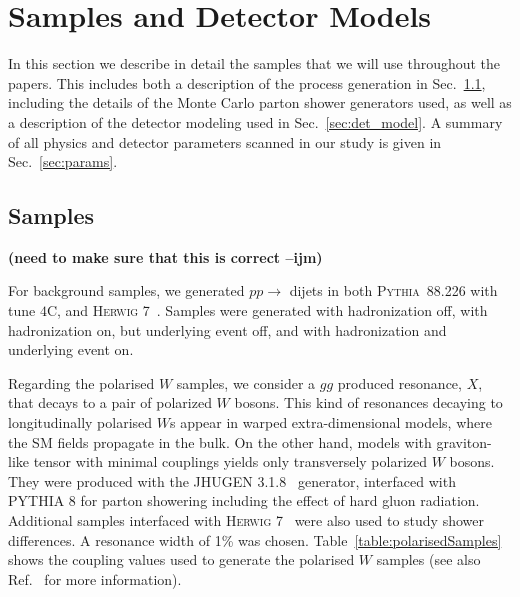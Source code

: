 \documentclass[11pt,letterpaper]{article}
\newcommand{\pythia}{\textsc{Pythia~8}\xspace}
\DeclareRobustCommand{\Sec}[1]{Sec.~\ref{#1}}
\newcommand{\ijm}[1]{\textbf{\textcolor{llblue}{(#1 --ijm)}}}
\begin{document}
\section{Samples and Detector Models}\label{sec:samples}


In this section we describe in detail the samples that we will use throughout the papers. This includes both a description of the process generation in \Sec{sec:samples_sub}, including the details of the Monte Carlo parton shower generators used, as well as a description of the detector modeling used in \Sec{sec:det_model}. A summary of all physics and detector parameters scanned in our study is given in \Sec{sec:params}.

\subsection{Samples}\label{sec:samples_sub}

\ijm{need to make sure that this is correct}

For background samples, we generated $pp\to$ dijets in both \pythia{8.226} \cite{Sjostrand:2006za,Sjostrand:2007gs} with tune $4$C,   and \textsc{Herwig} 7~\cite{Bahr:2008pv,Bellm:2015jjp}. Samples were generated with hadronization off, with hadronization on, but underlying event off, and with hadronization and underlying event on.





Regarding the polarised $W$ samples, we consider a $gg$ produced resonance, $X$, that decays to a pair of polarized $W$ bosons. This kind of resonances decaying to longitudinally polarised $W$s appear in warped extra-dimensional models, where the SM fields propagate in the bulk. On the other hand, models with graviton-like tensor with minimal couplings yields only transversely polarized $W$ bosons. They were produced with the \textsc{JHUGEN} 3.1.8~\cite{Gao:2010qx,Bolognesi:2012mm} generator, interfaced with \textsc{PYTHIA} 8 \cite{Sjostrand:2007gs} for parton showering including the effect of hard gluon radiation. Additional samples interfaced with \textsc{Herwig} 7~\cite{Bahr:2008pv,Bellm:2015jjp} were also used to study shower differences. A resonance width of 1\% was chosen. Table~\ref{table:polarisedSamples} shows the coupling values used to generate the polarised $W$ samples (see also Ref.~\cite{Gao:2010qx} for more information). 
\end{document}
